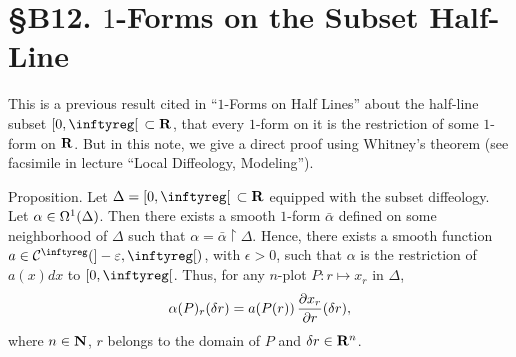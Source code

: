 
\chapter*{\S B12. $1$-Forms on the Subset Half-Line}
\setcounter{footnote}{0}


\begin{abstract}
  We revisit the fact that $1$-forms on $\LeftClosedInterval{0,\infty}\, \subset \RR$ are the restrictions of smooth $1$-forms defined on a neighborhood of the half-line in $\RR$.
\end{abstract}


This is a previous result cited in ``$1$-Forms on Half Lines'' about the half-line subset $\LeftClosedInterval{0,\infty}\, \subset \RR$,
that every $1$-form on it is the restriction of some $1$-form on $\RR$.
But in this note,
we give a direct proof using Whitney's theorem \cite[Theorem 1 and final remark]{Whi43} (see facsimile in lecture ``Local Diffeology, Modeling'').

\begin{Article}{Proposition.}{}
  Let $\Delta = \LeftClosedInterval{0,\infty}\, \subset \RR$ equipped with the subset diffeology.
  Let $\alpha \in \Omega^1(\Delta)$.
  Then there exists a smooth $1$-form $\bar\alpha$ defined on some neighborhood of $\Delta$ such that $\alpha = \bar\alpha \restriction \Delta$.
  Hence,
  there exists a smooth function $a \in \Cinfty(]-\epsilon,\infty[)$,
  with $\epsilon >0$,
  such that $\alpha$ is the restriction of $a(x) dx$ to $\LeftClosedInterval{0,\infty}$.
  Thus,
  for any $n$-plot $P : r \mapsto x_r$ in $\Delta$,
  $$
    \alpha(P)_r(\delta r) = a(P(r))\,{\partial x_r \over \partial r}(\delta r),
    $$
  where $n\in \mathbf{N}$,
  $r$ belongs to the domain of $P$ and $\delta r \in \mathbf{R}^n$.
\end{Article}

